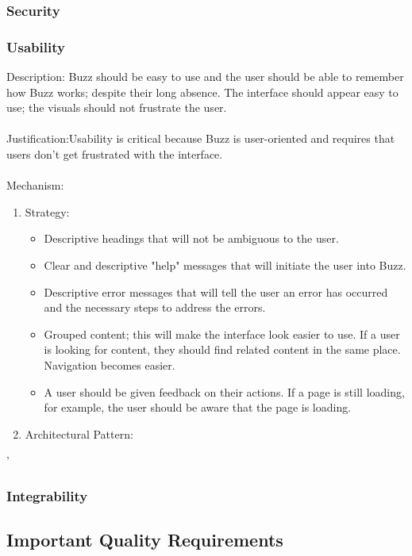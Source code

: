 \documentclass[a4paper,12pt,titlepage]{article}
\begin{document}
\subsubsection{Security}%
	
\subsubsection{Usability}%
	Description: Buzz should be easy to use and the user should be able to remember how Buzz works; despite their long absence. The interface should appear easy to use; the visuals should not frustrate the user.\\\\
	Justification:Usability is critical because Buzz is user-oriented and requires that users don't get frustrated with the interface. \\\\
	Mechanism:
	\begin{enumerate}
		\item Strategy:
		\begin{itemize}
			\item Descriptive headings that will not be ambiguous to the user.
			\item Clear and descriptive "help" messages that will initiate the user into Buzz. 
			\item Descriptive error messages that will tell the user an error has occurred and the necessary steps to address the errors.
			\item Grouped content; this will make the interface look easier to use. If a user is looking for content, they should find related content in the same place. Navigation becomes easier.
			\item A user should be given feedback on their actions. If a page is still loading, for example, the user should be aware that the page is loading.
		\end{itemize} 
		\item Architectural Pattern:
	\end{enumerate}'
\newpage
\subsubsection{Integrability}%
	
\newpage
\subsection{Important Quality Requirements}
\end{document}
